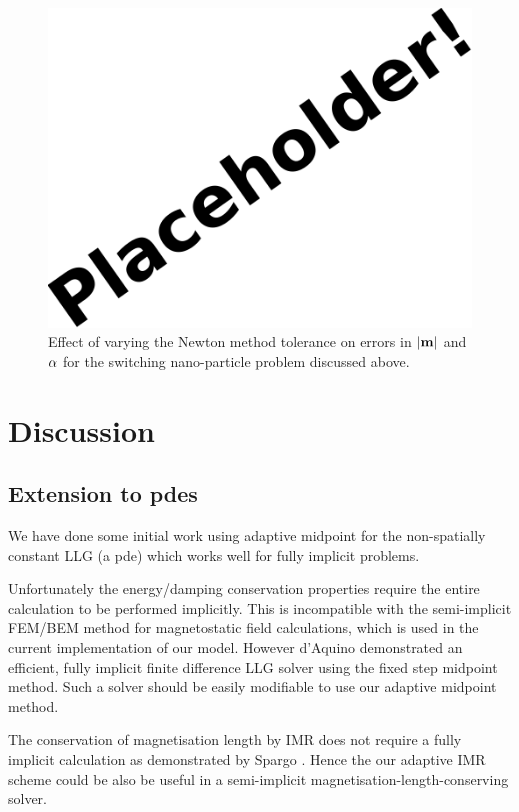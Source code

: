 \begin{figure}[ht!]
  \centering
  \includegraphics{images/placeholder}
  \caption{Effect of varying the Newton method tolerance on errors in $\lvert \mathbf{m} \rvert$ and $\alpha$  for the switching nano-particle problem discussed above.}
  \label{fig:newton-tol-errors-mp}
\end{figure}


\section{Discussion}

\subsection{Extension to pdes}

We have done some initial work using adaptive midpoint for the non-spatially constant LLG (\ie a pde) which works well for fully implicit problems.

Unfortunately the energy/damping conservation properties require the entire calculation to be performed implicitly.
This is incompatible with the semi-implicit FEM/BEM method for magnetostatic field calculations,\cite{Koehler1997} which is used in the current implementation of our model.
However d'Aquino \etal demonstrated an efficient, fully implicit finite difference LLG solver using the fixed step midpoint method\cite{DAquino2005}.
Such a solver should be easily modifiable to use our adaptive midpoint method.

The conservation of magnetisation length by IMR does not require a fully implicit calculation as demonstrated by Spargo \etal\cite{Spargo2003a}.
Hence the our adaptive IMR scheme could be also be useful in a semi-implicit magnetisation-length-conserving solver.


